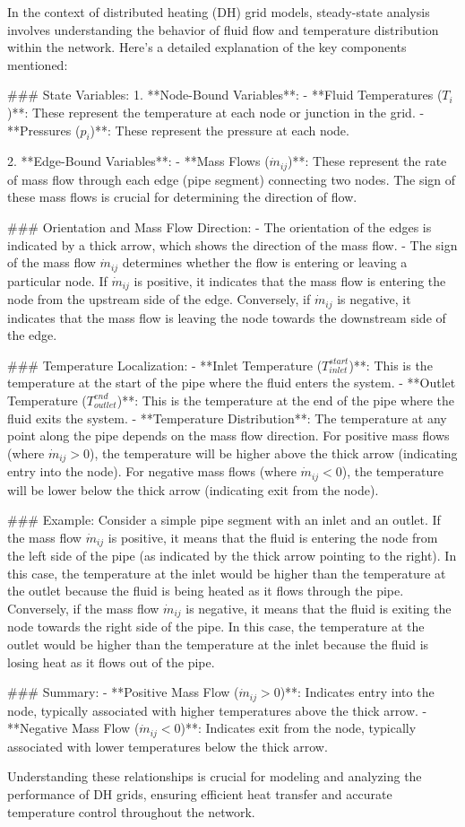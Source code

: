 In the context of distributed heating (DH) grid models, steady-state analysis involves understanding the behavior of fluid flow and temperature distribution within the network. Here's a detailed explanation of the key components mentioned:

### State Variables:
1. **Node-Bound Variables**:
   - **Fluid Temperatures ($T_i$)**: These represent the temperature at each node or junction in the grid.
   - **Pressures ($p_i$)**: These represent the pressure at each node.

2. **Edge-Bound Variables**:
   - **Mass Flows ($\dot{m}_{ij}$)**: These represent the rate of mass flow through each edge (pipe segment) connecting two nodes. The sign of these mass flows is crucial for determining the direction of flow.

### Orientation and Mass Flow Direction:
- The orientation of the edges is indicated by a thick arrow, which shows the direction of the mass flow.
- The sign of the mass flow $\dot{m}_{ij}$ determines whether the flow is entering or leaving a particular node. If $\dot{m}_{ij}$ is positive, it indicates that the mass flow is entering the node from the upstream side of the edge. Conversely, if $\dot{m}_{ij}$ is negative, it indicates that the mass flow is leaving the node towards the downstream side of the edge.

### Temperature Localization:
- **Inlet Temperature ($T_{inlet}^{start}$)**: This is the temperature at the start of the pipe where the fluid enters the system.
- **Outlet Temperature ($T_{outlet}^{end}$)**: This is the temperature at the end of the pipe where the fluid exits the system.
- **Temperature Distribution**: The temperature at any point along the pipe depends on the mass flow direction. For positive mass flows (where $\dot{m}_{ij} > 0$), the temperature will be higher above the thick arrow (indicating entry into the node). For negative mass flows (where $\dot{m}_{ij} < 0$), the temperature will be lower below the thick arrow (indicating exit from the node).

### Example:
Consider a simple pipe segment with an inlet and an outlet. If the mass flow $\dot{m}_{ij}$ is positive, it means that the fluid is entering the node from the left side of the pipe (as indicated by the thick arrow pointing to the right). In this case, the temperature at the inlet would be higher than the temperature at the outlet because the fluid is being heated as it flows through the pipe. Conversely, if the mass flow $\dot{m}_{ij}$ is negative, it means that the fluid is exiting the node towards the right side of the pipe. In this case, the temperature at the outlet would be higher than the temperature at the inlet because the fluid is losing heat as it flows out of the pipe.

### Summary:
- **Positive Mass Flow ($\dot{m}_{ij} > 0$)**: Indicates entry into the node, typically associated with higher temperatures above the thick arrow.
- **Negative Mass Flow ($\dot{m}_{ij} < 0$)**: Indicates exit from the node, typically associated with lower temperatures below the thick arrow.

Understanding these relationships is crucial for modeling and analyzing the performance of DH grids, ensuring efficient heat transfer and accurate temperature control throughout the network.
